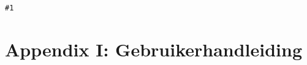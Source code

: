 \newcommand{\events}{\lstinline$Event$'s }
\newcommand{\actions}{\lstinline$Action$'s }
\newcommand{\shapes}{\lstinline$Shapes$'s }
\newcommand{\type}{1}{\lstinline$#1$}
\newcommand{\shape}{\type{Shape}}



\part{Appendix I: Gebruikerhandleiding} \label{sec:gebruikershandleiding}






